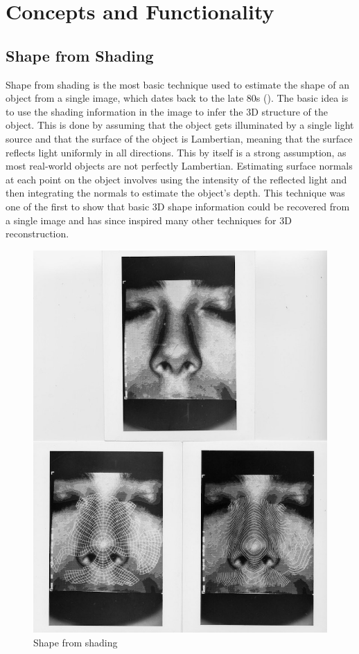 
\section{Concepts and Functionality}

\subsection{Shape from Shading}
Shape from shading is the most basic technique used to estimate the shape of an object from a single image, which dates back to the late 80s (\textcite{horn_shape_1989}).
The basic idea is to use the shading information in the image to infer the 3D structure of the object. This is done by assuming that the object gets illuminated by a single light source and that the surface of the object is Lambertian, meaning that the surface reflects light uniformly in all directions. This by itself is a strong assumption, as most real-world objects are not perfectly Lambertian.
Estimating surface normals at each point on the object involves using the intensity of the reflected light and then integrating the normals to estimate the object's depth. This technique was one of the first to show that basic 3D shape information could be recovered from a single image and has since inspired many other techniques for 3D reconstruction.
\begin{figure}
    \centering
    \includegraphics[width=0.5\linewidth]{images/shape_from_shading.jpg}
    \caption{Shape from shading \autocite{horn_shape_1989}}
    \label{fig:shape_from_shading}
\end{figure}

